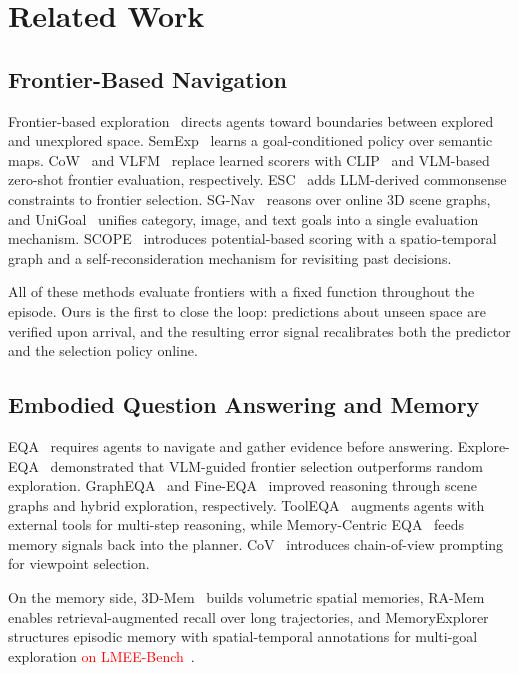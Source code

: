 \section{Related Work}

\subsection{Frontier-Based Navigation}

Frontier-based exploration~\cite{yamauchi1997frontier} directs agents toward boundaries between explored and unexplored space. SemExp~\cite{chaplot2020semexp} learns a goal-conditioned policy over semantic maps. CoW~\cite{gadre2023cow} and VLFM~\cite{yokoyama2024vlfm} replace learned scorers with CLIP~\cite{radford2021clip} and VLM-based zero-shot frontier evaluation, respectively. ESC~\cite{zhou2023esc} adds LLM-derived commonsense constraints to frontier selection. SG-Nav~\cite{yin2024sgnav} reasons over online 3D scene graphs, and UniGoal~\cite{yin2025unigoal} unifies category, image, and text goals into a single evaluation mechanism. SCOPE~\cite{wang2026scope} introduces potential-based scoring with a spatio-temporal graph and a self-reconsideration mechanism for revisiting past decisions.

All of these methods evaluate frontiers with a fixed function throughout the episode. Ours is the first to close the loop: predictions about unseen space are verified upon arrival, and the resulting error signal recalibrates both the predictor and the selection policy online.

\subsection{Embodied Question Answering and Memory}

EQA~\cite{das2018eqa} requires agents to navigate and gather evidence before answering. Explore-EQA~\cite{ren2024exploreeqa} demonstrated that VLM-guided frontier selection outperforms random exploration. GraphEQA~\cite{saxena2025grapheqa} and Fine-EQA~\cite{jiang2025fineeqa} improved reasoning through scene graphs and hybrid exploration, respectively. ToolEQA~\cite{wang2025tooleqa} augments agents with external tools for multi-step reasoning, while Memory-Centric EQA~\cite{zhai2025memorycentric} feeds memory signals back into the planner. CoV~\cite{cov2026} introduces chain-of-view prompting for viewpoint selection.

On the memory side, 3D-Mem~\cite{huang20243dmem} builds volumetric spatial memories, RA-Mem~\cite{yang2024ramem} enables retrieval-augmented recall over long trajectories, and MemoryExplorer~\cite{wang2026memoryexplorer} structures episodic memory with spatial-temporal annotations for multi-goal exploration\textcolor{red}{ on LMEE-Bench~\cite{wang2026memoryexplorer}}.

